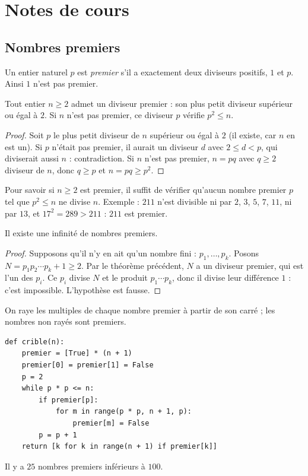 \mxnewpage
\section{Notes de cours}
\subsection{Nombres premiers}
\begin{definition}
Un entier naturel $p$ est \emph{premier} s'il a exactement deux diviseurs positifs, $1$ et $p$. Ainsi $1$ n'est pas premier.
\end{definition}
\begin{theorem}
Tout entier $n\ge2$ admet un diviseur premier : son plus petit diviseur supérieur ou égal à $2$. Si $n$ n'est pas premier, ce diviseur $p$ vérifie $p^2\le n$.
\end{theorem}
\begin{proof}
Soit $p$ le plus petit diviseur de $n$ supérieur ou égal à $2$ (il existe, car $n$ en est un). Si $p$ n'était pas premier, il aurait un diviseur $d$ avec $2\le d<p$, qui diviserait aussi $n$ : contradiction. Si $n$ n'est pas premier, $n=pq$ avec $q\ge2$ diviseur de $n$, donc $q\ge p$ et $n=pq\ge p^2$.
\end{proof}
\begin{method}
Pour savoir si $n\ge2$ est premier, il suffit de vérifier qu'aucun nombre premier $p$ tel que $p^2\le n$ ne divise $n$. Exemple : $211$ n'est divisible ni par $2$, $3$, $5$, $7$, $11$, ni par $13$, et $17^2=289>211$ : $211$ est premier.
\end{method}
\begin{theorem}
Il existe une infinité de nombres premiers.
\end{theorem}
\begin{proof}
Supposons qu'il n'y en ait qu'un nombre fini : $p_1,\dots,p_k$. Posons $N=p_1p_2\cdots p_k+1\ge2$. Par le théorème précédent, $N$ a un diviseur premier, qui est l'un des $p_i$. Ce $p_i$ divise $N$ et le produit $p_1\cdots p_k$, donc il divise leur différence $1$ : c'est impossible. L'hypothèse est fausse.
\end{proof}
\begin{keypoint}
On raye les multiples de chaque nombre premier à partir de son carré ; les nombres non rayés sont premiers.
\begin{lstlisting}
def crible(n):
    premier = [True] * (n + 1)
    premier[0] = premier[1] = False
    p = 2
    while p * p <= n:
        if premier[p]:
            for m in range(p * p, n + 1, p):
                premier[m] = False
        p = p + 1
    return [k for k in range(n + 1) if premier[k]]
\end{lstlisting}
Il y a $25$ nombres premiers inférieurs à $100$.
\end{keypoint}

